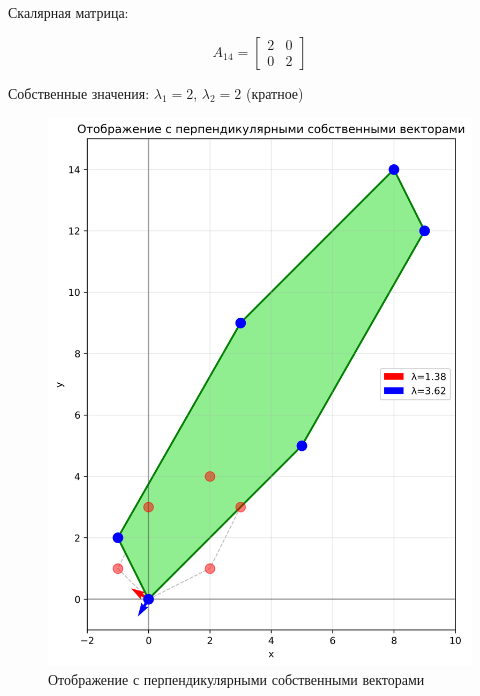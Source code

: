 Скалярная матрица:

\begin{equation}
A_{14} = \begin{bmatrix} 2 & 0 \\ 0 & 2 \end{bmatrix}
\end{equation}

Собственные значения: $\lambda_1 = 2$, $\lambda_2 = 2$ (кратное)

\begin{figure}[h]
\centering
\begin{minipage}{0.31\textwidth}
\centering
\includegraphics[width=\textwidth]{images/task1/perpendicular_eigenvectors.png}
\caption{Отображение с перпендикулярными собственными векторами}
\label{fig:perpendicular_eigenvectors}
\end{minipage}
\hfill
\begin{minipage}{0.31\textwidth}
\centering

\end{minipage}
\end{figure}
